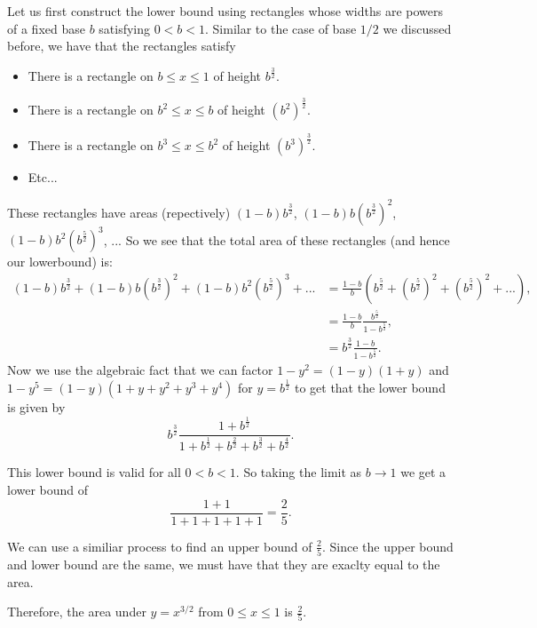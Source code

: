 Let us first construct the lower bound using rectangles whose widths are powers of a fixed base \(b\) satisfying \(0 < b < 1\). 
Similar to the case of base \(1/2\) we discussed before, we have that the rectangles satisfy
\begin{itemize}
\item There is a rectangle on \(b \leq x \leq 1\) of height \(b^{\frac{3}{2}}\).
\item There is a rectangle on \(b^2 \leq x \leq b\) of height \(\left(b^2\right)^{\frac{3}{2}}\).
\item There is a rectangle on \(b^3 \leq x \leq b^2\) of height \(\left(b^3\right)^{\frac{3}{2}}\).
\item Etc...
\end{itemize}
These rectangles have areas (repectively) \((1 - b)b^{\frac{3}{2}}\), \((1 - b) b\left(b^{\frac{3}{2}}\right)^2\), \((1-b)b^2\left(b^{\frac{5}{2}}\right)^3\), ...
So we see that the total area of these rectangles (and hence our lowerbound) is:
\begin{align}
(1 - b)b^{\frac{3}{2}} + (1 - b) b\left(b^{\frac{3}{2}}\right)^2 + (1-b)b^2\left(b^{\frac{5}{2}}\right)^3 + ... 
    & = \frac{1 - b}{b} \left( b^{\frac{5}{2}} + \left(b^{\frac{5}{2}}\right)^2 + \left(b^{\frac{5}{2}}\right)^2 + ...\right), \\
    & = \frac{1 - b}{b} \frac{b^{\frac{5}{2}}} {1 - b^{\frac{5}{2}}}, \\
    & = b^{\frac{3}{2}} \frac{1 - b}{1 - b^{\frac{5}{2}}}.
\end{align}
Now we use the algebraic fact that we can factor \(1 - y^2 = (1  - y) (1 + y)\) and \(1 - y^5 = (1 - y)(1 + y + y^2 + y^3 + y^4)\) for \(y = b^{\frac{1}{2}}\) to get that the lower bound is given by
\begin{equation}
b^{\frac{3}{2}} \frac{1 + b^{\frac{1}{2}}}
    {1 + b^{\frac{1}{2}} + b^{\frac{2}{2}} + b^{\frac{3}{2}} + b^{\frac{4}{2}}}.
\end{equation}

This lower bound is valid for all \(0 < b < 1\). So taking the limit as \(b \to 1\) we get a lower bound of
\begin{equation}
\frac{1 + 1}{1 + 1+ 1+ 1 + 1} = \frac{2}{5}.
\end{equation} 

We can use a similiar process to find an upper bound of \(\frac{2}{5}\). Since the upper bound and lower bound are the same, we must have that they are exaclty equal to the area.

Therefore, the area under \(y = x^{3/2}\) from \(0 \leq x \leq 1\) is \(\frac{2}{5}\).
